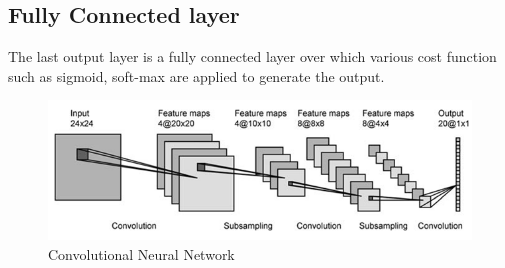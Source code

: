 \subsection{Fully Connected layer}
The last output layer is a fully connected layer over which various cost function such as sigmoid, soft-max are applied to generate the output.


\begin{figure}[H]
  \centering
    \includegraphics[scale=.6, angle=0]{Files/cnn-2.png}
    \caption[Convolutional Neural Network]{Convolutional Neural Network}
    \label{fig:CNN}
\end{figure}